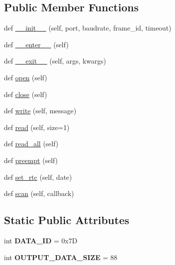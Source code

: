 \subsection*{Public Member Functions}
\begin{DoxyCompactItemize}
\item 
def \hyperlink{classteledyne__navigator_1_1driver_1_1TeledyneNavigator_a1ebe1cad172dbc3b1e4daad75375b816}{\+\_\+\+\_\+init\+\_\+\+\_\+} (self, port, baudrate, frame\+\_\+id, timeout)
\item 
def \hyperlink{classteledyne__navigator_1_1driver_1_1TeledyneNavigator_ad32b886ab3f18b15ddde6efa3244a0fe}{\+\_\+\+\_\+enter\+\_\+\+\_\+} (self)
\item 
def \hyperlink{classteledyne__navigator_1_1driver_1_1TeledyneNavigator_ab9932856f685cb31f49c88b8ee881033}{\+\_\+\+\_\+exit\+\_\+\+\_\+} (self, args, kwargs)
\item 
def \hyperlink{classteledyne__navigator_1_1driver_1_1TeledyneNavigator_a12f45b50bc236f1616f639601e8ee60d}{open} (self)
\item 
def \hyperlink{classteledyne__navigator_1_1driver_1_1TeledyneNavigator_a5731ac2e23b7abdc46158f0c7895a4cd}{close} (self)
\item 
def \hyperlink{classteledyne__navigator_1_1driver_1_1TeledyneNavigator_aab52bb45e1e056cae53c8cd284bb7dd8}{write} (self, message)
\item 
def \hyperlink{classteledyne__navigator_1_1driver_1_1TeledyneNavigator_acf8e95e94208852726b9d31d6d515283}{read} (self, size=1)
\item 
def \hyperlink{classteledyne__navigator_1_1driver_1_1TeledyneNavigator_a9597a73bb812d291b034c081e6320dc4}{read\+\_\+all} (self)
\item 
def \hyperlink{classteledyne__navigator_1_1driver_1_1TeledyneNavigator_a4f109176c15e3cb9ef80d337fb9b507b}{preempt} (self)
\item 
def \hyperlink{classteledyne__navigator_1_1driver_1_1TeledyneNavigator_a8ba38b5d0ea4f9befed369fd150ab991}{set\+\_\+rtc} (self, date)
\item 
def \hyperlink{classteledyne__navigator_1_1driver_1_1TeledyneNavigator_a1158a9934cf94577e581e35ad562a5e1}{scan} (self, callback)
\end{DoxyCompactItemize}
\subsection*{Static Public Attributes}
\begin{DoxyCompactItemize}
\item 
\mbox{\label{classteledyne__navigator_1_1driver_1_1TeledyneNavigator_a03b3777201d4950726bad14aaa77928e}} 
int {\bfseries D\+A\+T\+A\+\_\+\+ID} = 0x7D
\item 
\mbox{\label{classteledyne__navigator_1_1driver_1_1TeledyneNavigator_a598d8b2cb6e165f3ce5be384d6da00f2}} 
int {\bfseries O\+U\+T\+P\+U\+T\+\_\+\+D\+A\+T\+A\+\_\+\+S\+I\+ZE} = 88
\end{DoxyCompactItemize}


